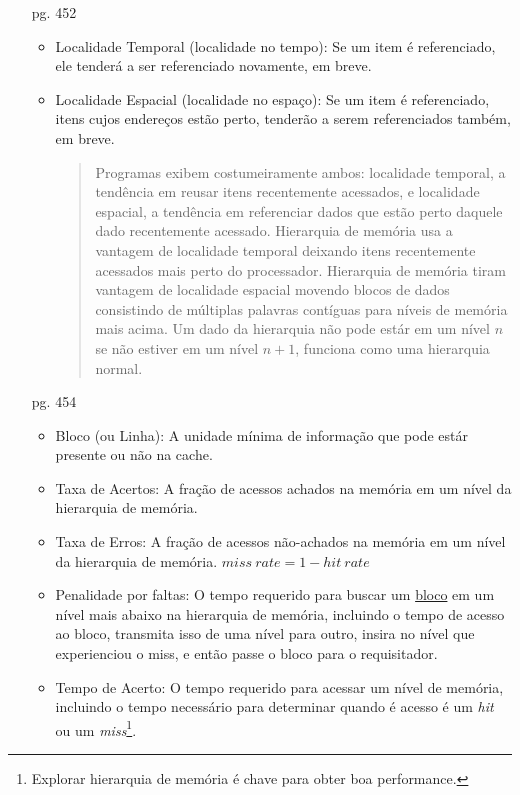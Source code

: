 \documentclass{article}
\begin{document}
\begin{enumerate}

\item[pg. 452]
\begin{itemize}
\item Localidade Temporal (localidade no tempo): Se um item é referenciado, ele
tenderá a ser referenciado novamente, em breve.
\item Localidade Espacial (localidade no espaço): Se um item é referenciado,
itens cujos endereços estão perto, tenderão a serem referenciados também, em
breve.

\begin{quotation}
\parbox{0.8\textwidth}{ Programas exibem costumeiramente ambos: localidade
temporal, a tendência em reusar itens recentemente acessados, e localidade
espacial, a tendência em referenciar dados que estão perto daquele dado
recentemente acessado. Hierarquia de memória usa a vantagem de localidade
temporal deixando itens recentemente acessados mais perto do processador.
Hierarquia de memória tiram vantagem de localidade espacial movendo blocos de
dados consistindo de múltiplas palavras contíguas para níveis de memória mais
acima. Um dado da hierarquia não pode estár em um nível $n$ se não estiver em 
um nível $n+1$, funciona como uma hierarquia normal.}
\end{quotation}

\end{itemize}
\item[pg. 454]
\begin{itemize}
\item Bloco (ou Linha): A unidade mínima de informação que pode estár presente 
ou não na cache.
\item Taxa de Acertos: A fração de acessos achados na memória em um nível da 
hierarquia de memória.
\item Taxa de Erros: A fração de acessos não-achados na memória em um nível da 
hierarquia de memória. $miss\ rate = 1 - hit\ rate$
\item Penalidade por faltas: O tempo requerido para buscar um \underline{bloco} 
em um nível mais abaixo na hierarquia de memória, incluindo o tempo de acesso 
ao bloco, transmita isso de uma nível para outro, insira no nível que 
experienciou o miss, e então passe o bloco para o requisitador.
\item Tempo de Acerto: O tempo requerido para acessar um nível de memória, 
incluindo o tempo necessário para determinar quando é acesso é um \textit{hit} 
ou um \textit{miss}\footnote{Explorar hierarquia de memória é chave para obter 
boa performance.}.
\end{itemize}


\end{enumerate}
\end{document}
